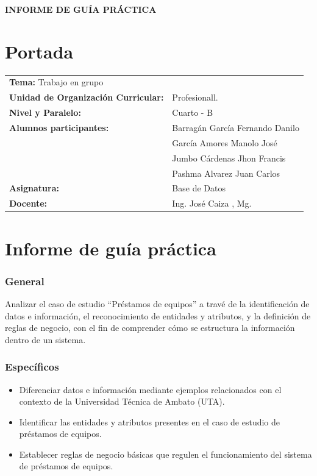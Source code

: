 \documentclass{article}
\begin{document}
\begin{center}
    {\large \textbf{INFORME DE GUÍA PRÁCTICA}} \\    
\end{center}

\section{Portada}
\begin{flushleft}
\begin{tabular}{ l l }
    \textbf{Tema:} Trabajo en grupo &  \\
    \textbf{Unidad de Organización Curricular:} & Profesionall. \\
    \textbf{Nivel y Paralelo:} & Cuarto - B \\
    \textbf{Alumnos participantes:} & Barragán García Fernando Danilo \\& García Amores Manolo José\\&Jumbo Cárdenas Jhon Francis \\& Pashma Alvarez Juan Carlos
     \\
    \textbf{Asignatura:} & Base de Datos \\
    \textbf{Docente:} & Ing. José Caiza , Mg. \\
\end{tabular}
\end{flushleft}


\section{Informe de guía práctica}
\subsubsection{General}
Analizar el caso de estudio “Préstamos de equipos” a travé de la identificación de datos e información, el reconocimiento de entidades y atributos, y la definición de reglas de negocio, con el fin de comprender cómo se estructura la información dentro de un sistema.

\subsubsection{Específicos}

\begin{itemize}
    \item Diferenciar datos e información mediante ejemplos relacionados con el contexto de la Universidad Técnica de Ambato (UTA).

    \item Identificar las entidades y atributos presentes en el caso de estudio de préstamos de equipos.

    \item Establecer reglas de negocio básicas que regulen el funcionamiento del sistema de préstamos de equipos.
\end{itemize}
\end{document}

